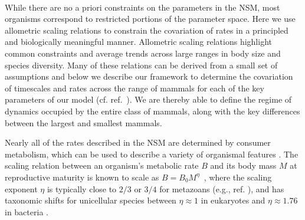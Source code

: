 \documentclass{pnastwo}
\begin{document}
\begin{article}
 \\
While there are no a priori constraints on the parameters in the NSM, most
organisms correspond to restricted portions of the parameter space.  Here we
use allometric scaling relations to constrain the covariation of rates in a
principled and biologically meaningful manner.  Allometric scaling relations
highlight common constraints and average trends across large ranges in body
size and species diversity. Many of these relations can be derived from a
small set of assumptions and below we describe our framework to determine the
covariation of timescales and rates across the range of mammals for each of
the key parameters of our model (cf. ref.~).  We are thereby
able to define the regime of dynamics occupied by the entire class of mammals, along with the key differences between the largest and smallest mammals.


Nearly all of the rates described in the NSM are determined by consumer
metabolism, which can be used to describe a variety of organismal features
\cite{Brown:2004wq}.  The scaling relation between an organism's metabolic
rate $B$ and its body mass $M$ at reproductive maturity is known to scale as
$B = B_0 M^\eta$~\cite{West:2002it}, where the scaling exponent $\eta$ is
typically close to $2/3$ or $3/4$ for metazoans (e.g., ref. ),
and has taxonomic shifts for unicellular species between $\eta\approx 1$ in
eukaryotes and $\eta\approx 1.76$ in bacteria
\cite{DeLong:2010dy,Kempes:2012hy}.


\end{article}
\end{document}
